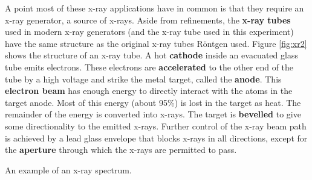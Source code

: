 A point most of these x-ray applications have in common is that they require an x-ray generator, a source of x-rays. Aside from refinements, the {\bf x-ray tubes} used in modern x-ray generators (and the x-ray tube used in this experiment) have the same structure as the original x-ray tubes R\"{o}ntgen used. Figure \ref{fig:xr2} shows the structure of an x-ray tube. A hot {\bf cathode} inside an evacuated glass tube emits electrons. These electrons are {\bf accelerated} to the other end of the tube by a high voltage and strike the metal target, called the {\bf anode}.  This {\bf electron beam} has enough energy to directly interact with the atoms in the target anode. Most of this energy (about 95\%) is lost in the target as heat. The remainder of the energy is converted into x-rays. The target is {\bf bevelled} to give some directionality to the emitted x-rays. Further control of the x-ray beam path is achieved by a lead glass envelope that blocks x-rays in all directions, except for the {\bf aperture} through which the x-rays are permitted to pass.

\begin{marginfigure}
\caption{An example of an x-ray spectrum.}
\label{fig:xr3}
\end{marginfigure}

